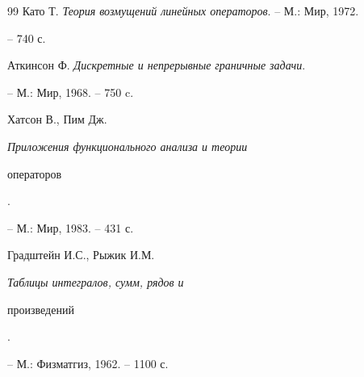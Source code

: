 \begin{thebibliography}{99}
Като Т. {\em Теория возмущений линейных операторов}. -- М.: Мир, 1972. 


-- 740 с. 




Аткинсон Ф. {\em Дискретные и непрерывные граничные задачи}. 


-- М.: Мир, 1968. -- 750 c. 




Хатсон В., Пим Дж. {\em Приложения функционального анализа и теории 


операторов}. 


-- М.: Мир, 1983. -- 431 с. 




Градштейн И.С., Рыжик И.М. {\em Таблицы интегралов, сумм, рядов и 


произведений}. 


-- М.: Физматгиз, 1962. -- 1100 с. 


 


\end{thebibliography} 


 


\vskip 2cm 


 






 


\label{end} 


 


 


